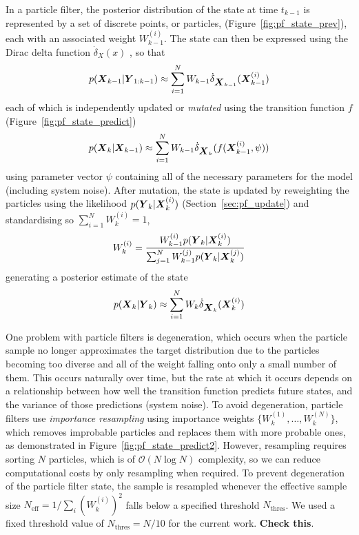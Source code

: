 In a particle filter, the posterior distribution of the state at time $t_{k-1}$
is represented by a set of discrete points, or particles, (Figure~\ref{fig:pf_state_prev}),
each with an associated weight $W_{k-1}^{(i)}$.
The state can then be expressed using the Dirac delta function $\dot\delta_X(x)$ \citep{cn},
so that
\begin{equation*}
p(\mbox{$\boldsymbol{X}$}_{k-1} | \mbox{$\boldsymbol{Y}$}_{1:k-1}) \approx 
    \sum_{i=1}^N W_{k-1} \dot\delta_{\mbox{$\boldsymbol{X}$}_{k-1}}(\mbox{$\boldsymbol{X}$}_{k-1}^{(i)})
\end{equation*}
each of which is independently updated or \emph{mutated} using the transition function $f$ (Figure~\ref{fig:pf_state_predict})
\begin{equation*}
p(\mbox{$\boldsymbol{X}$}_k | \mbox{$\boldsymbol{X}$}_{k-1}) \approx 
    \sum_{i=1}^N W_{k-1} \dot\delta_{\mbox{$\boldsymbol{X}$}_{k}}(f(\mbox{$\boldsymbol{X}$}_{k-1}^{(i)}, \psi))
\end{equation*}
using parameter vector $\psi$ containing all of the necessary parameters
for the model (including system noise).
After mutation, 
the state is updated by reweighting the particles using the likelihood $p(\mbox{$\boldsymbol{Y}$}_k | \mbox{$\boldsymbol{X}$}_k^{(i)})$ 
(Section~\ref{sec:pf_update}) and standardising so $\sum_{i=1}^N W_k^{(i)} = 1$,
\begin{equation*}
W_k^{(i)} = \frac{W_{k-1}^{(i)} p(\mbox{$\boldsymbol{Y}$}_k | \mbox{$\boldsymbol{X}$}_k^{(i)})}{
    \sum_{j=1}^N W_{k-1}^{(j)} p(\mbox{$\boldsymbol{Y}$}_k | \mbox{$\boldsymbol{X}$}_k^{(j)})
}
\end{equation*}
generating a posterior estimate of the state
\begin{equation*}
p(\mbox{$\boldsymbol{X}$}_k | \mbox{$\boldsymbol{Y}$}_k) \approx  
    \sum_{i=1}^N W_{k} \dot\delta_{\mbox{$\boldsymbol{X}$}_{k}}(\mbox{$\boldsymbol{X}$}_{k}^{(i)})
\end{equation*}

One problem with particle filters is degeneration,
which occurs when the particle sample no longer approximates the target distribution
due to the particles becoming too diverse
and all of the weight falling onto only a small number of them.
This occurs naturally over time, but the rate at which it occurs depends 
on a relationship between how well the transition function predicts future states,
and the variance of those predictions (system noise).
To avoid degeneration,
particle filters use \emph{importance resampling}
using importance weights $\{W_k^{(1)}, \ldots, W_k^{(N)}\}$,
which removes improbable particles and replaces them with more probable ones,
as demonstrated in Figure~\ref{fig:pf_state_predict2}.
However, resampling requires sorting $N$ particles,
which is of $\mathcal{O}(N\log N)$ complexity,
so we can reduce computational costs by only resampling when required.
To prevent degeneration of the particle filter state,
the sample is resampled whenever the
effective sample size $N_{\text{eff}} = 1 / \sum_i (W_k^{(i)})^2$
falls below a specified threshold $N_{\text{thres}}$.
We used a fixed threshold value of $N_{\text{thres}} = N/10$
for the current work.
\textbf{Check this}.

